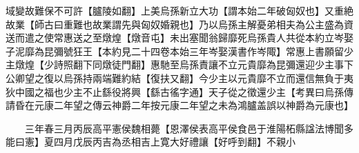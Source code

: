 域變故難保不可許【臚陵如翻】上美烏孫新立大功【謂本始二年破匈奴也】又重絶故業【師古曰重難也故業謂先與匈奴婚親也】乃以烏孫主解憂弟相夫為公主盛為資送而遣之使常惠送之至燉煌【燉音屯】未出塞聞翁歸靡死烏孫貴人共從本約立岑娶子泥靡為昆彌號狂王【本約見二十四卷本始三年岑娶漢書作岑陬】常惠上書願留少主燉煌【少詩照翻下同燉徒門翻】惠馳至烏孫責讓不立元貴靡為昆彌還迎少主事下公卿望之復以烏孫持兩端難約結【復扶又翻】今少主以元貴靡不立而還信無負于夷狄中國之福也少主不止繇役將興【繇古徭字通】天子從之徵還少主【考異曰烏孫傳請昏在元康二年望之傳云神爵二年按元康二年望之未為鴻臚盖誤以神爵為元康也】

　　三年春三月丙辰高平憲侯魏相薨【恩澤侯表高平侯食邑于淮陽柘縣諡法博聞多能曰憲】夏四月戊辰丙吉為丞相吉上寛大好禮讓【好呼到翻】不親小